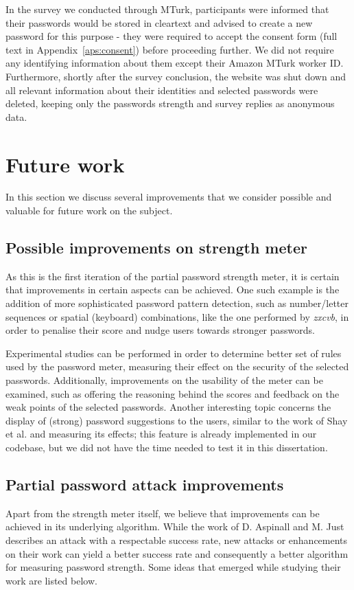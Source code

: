     In the survey we conducted through MTurk, participants were informed that their passwords would be stored in cleartext and advised to create a new password for this purpose - they were required to accept the consent form (full text in Appendix~\ref{aps:consent}) before proceeding further. We did not require any identifying information about them except their Amazon MTurk worker ID. Furthermore, shortly after the survey conclusion, the website was shut down and all relevant information about their identities and selected passwords were deleted, keeping only the passwords strength and survey replies as anonymous data.

  \section{Future work}
    \label{sec:future_work}

    In this section we discuss several improvements that we consider possible and valuable for future work on the subject.

    \subsection{Possible improvements on strength meter}
      \label{ssec:meter_improvements}
      As this is the first iteration of the partial password strength meter, it is certain that improvements in certain aspects can be achieved. One such example is the addition of more sophisticated password pattern detection, such as number/letter sequences or spatial (keyboard) combinations, like the one performed by \emph{zxcvb}, in order to penalise their score and nudge users towards stronger passwords.

      Experimental studies can be performed in order to determine better set of rules used by the password meter, measuring their effect on the security of the selected passwords. Additionally, improvements on the usability of the meter can be examined, such as offering the reasoning behind the scores and feedback on the weak points of the selected passwords. Another interesting topic concerns the display of (strong) password suggestions to the users, similar to the work of Shay et al.\cite{usability_system_assigned_pass} and measuring its effects; this feature is already implemented in our codebase, but we did not have the time needed to test it in this dissertation.

    \subsection{Partial password attack improvements}
      \label{ssec:attack_improvements}
      Apart from the strength meter itself, we believe that improvements can be achieved in its underlying algorithm. While the work of D. Aspinall and M. Just~\cite{part_pass} describes an attack with a respectable success rate, new attacks or enhancements on their work can yield a better success rate and consequently a better algorithm for measuring password strength. Some ideas that emerged while studying their work are listed below.

